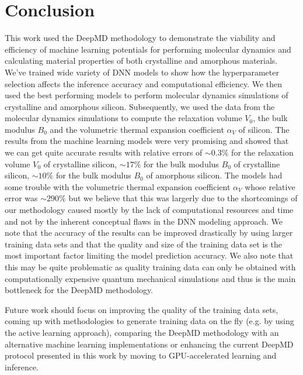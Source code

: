 \chapter{Conclusion}

This work used the DeepMD methodology to demonstrate the viability and
efficiency of machine learning potentials for performing molecular dynamics
and calculating material properties of both crystalline and amorphous
materials. We've trained wide variety of DNN models to show how the
hyperparameter selection affects the inference accuracy and computational
efficiency. We then used the best performing models to perform molecular
dynamics simulations of crystalline and amorphous silicon. Subsequently, we
used the data from the molecular dynamics simulations to compute the
relaxation volume $V_0$, the bulk modulus $B_0$ and the volumetric thermal
expansion coefficient $\alpha_V$ of silicon. The results from the machine
learning models were very promising and showed that we can get quite accurate
results with relative errors of $\sim 0.3\%$ for the relaxation volume $V_0$
of crystalline silicon, $\sim 17 \%$ for the bulk modulus $B_0$ of crystalline
silicon, $\sim 10 \%$ for the bulk modulus $B_0$ of amorphous silicon. The
models had some trouble with the volumetric thermal expansion coefficient
$\alpha_V$ whose relative error was $\sim 290 \%$ but we believe that this was
largerly due to the shortcomings of our methodology caused mostly by the lack
of computational resources and time and not by the inherent conceptual flaws
in the DNN modeling approach. We note that the accuracy of the results
can be improved drastically by using larger training data sets and that the
quality and size of the training data set is the most important factor
limiting the model prediction accuracy. We also note that this may be quite
problematic as quality training data can only be obtained with computationally
expensive quantum mechanical simulations and thus is the main bottleneck for
the DeepMD methodology.

Future work should focus on improving the quality of the training data sets,
coming up with methodologies to generate training data on the fly (e.g. by
using the active learning approach), comparing the DeepMD methodology with
an alternative machine learning implementations or enhancing the current
DeepMD protocol presented in this work by moving to GPU-accelerated learning
and inference. 
